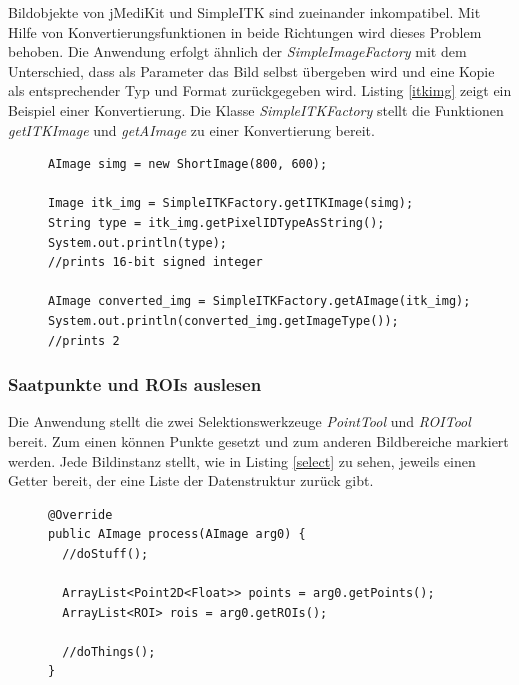 Bildobjekte von jMediKit und SimpleITK sind zueinander inkompatibel. Mit Hilfe von Konvertierungsfunktionen in beide Richtungen wird dieses Problem behoben. Die Anwendung erfolgt ähnlich der \textit{SimpleImageFactory} mit dem Unterschied, dass als Parameter das Bild selbst übergeben wird und eine Kopie als entsprechender Typ und Format zurückgegeben wird. Listing \ref{itkimg} zeigt ein Beispiel einer Konvertierung. Die Klasse \textit{SimpleITKFactory} stellt die Funktionen \textit{getITKImage} und \textit{getAImage} zu einer Konvertierung bereit.

\begin{figure}[htbp]
\begin{lstlisting}[frame=leftline]
AImage simg = new ShortImage(800, 600);

Image itk_img = SimpleITKFactory.getITKImage(simg);
String type = itk_img.getPixelIDTypeAsString();
System.out.println(type);
//prints 16-bit signed integer
		
AImage converted_img = SimpleITKFactory.getAImage(itk_img);
System.out.println(converted_img.getImageType());
//prints 2
\end{lstlisting}
\end{figure}

\subsubsection{Saatpunkte und ROIs auslesen}

Die Anwendung stellt die zwei Selektionswerkzeuge \textit{PointTool} und \textit{ROITool} bereit. Zum einen können Punkte gesetzt und zum anderen Bildbereiche markiert werden. Jede Bildinstanz stellt, wie in Listing \ref{select} zu sehen, jeweils einen Getter bereit, der eine Liste der Datenstruktur zurück gibt.

\begin{figure}[htbp]
\begin{lstlisting}[frame=leftline]
@Override
public AImage process(AImage arg0) {
  //doStuff();

  ArrayList<Point2D<Float>> points = arg0.getPoints();
  ArrayList<ROI> rois = arg0.getROIs();
  
  //doThings();
}
\end{lstlisting}
\end{figure}

